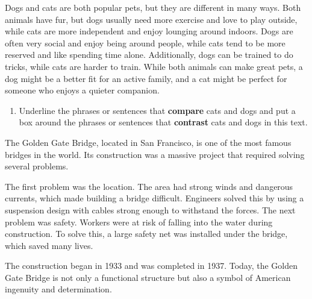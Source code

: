 \documentclass[12pt]{article}
\begin{document}
\vspace {0.3cm}
\begin{tcolorbox}[colframe=black!60, colback=white, 
coltitle=black, colbacktitle=black!15, fonttitle=\bfseries\Large, 
title=Guided Practice, halign title=center, left=10pt, right=10pt, top=10pt, bottom=15pt]


Dogs and cats are both popular pets, but they are different in many ways. Both animals have fur, but dogs usually need more exercise and love to play outside, while cats are more independent and enjoy lounging around indoors. Dogs are often very social and enjoy being around people, while cats tend to be more reserved and like spending time alone. Additionally, dogs can be trained to do tricks, while cats are harder to train. While both animals can make great pets, a dog might be a better fit for an active family, and a cat might be perfect for someone who enjoys a quieter companion.

  

 

\begin{enumerate}[itemsep=3em]
   \item Underline the phrases or sentences that \textbf{compare} cats and dogs and put a box around the phrases or sentences that \textbf{contrast} cats and dogs in this text.
\end{enumerate}
\end{tcolorbox}




\begin{tcolorbox}[colframe=black!60, colback=white, 
coltitle=black, colbacktitle=black!15, fonttitle=\bfseries\Large, 
title=Text: Building the Golden Gate Bridge, halign title=center, left=10pt, right=10pt, top=10pt, bottom=15pt]
The Golden Gate Bridge, located in San Francisco, is one of the most famous bridges in the world. Its construction was a massive project that required solving several problems. 

The first problem was the location. The area had strong winds and dangerous currents, which made building a bridge difficult. Engineers solved this by using a suspension design with cables strong enough to withstand the forces. The next problem was safety. Workers were at risk of falling into the water during construction. To solve this, a large safety net was installed under the bridge, which saved many lives.

The construction began in 1933 and was completed in 1937. Today, the Golden Gate Bridge is not only a functional structure but also a symbol of American ingenuity and determination.
\end{tcolorbox}
\end{document}
